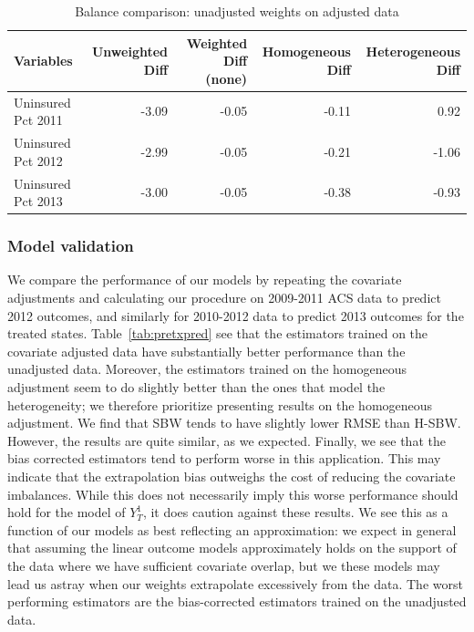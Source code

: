 \documentclass[article]{imsart}
\theoremstyle{plain}
\theoremstyle{remark}
\begin{document}
\begin{table}[ht]
\caption{Balance comparison: unadjusted weights on adjusted data}
\label{tab:balcomp}
\begin{tabular}{lrrrr}
  \hline
Variables & Unweighted Diff & Weighted Diff (none) & Homogeneous Diff & Heterogeneous Diff\\ 
  \hline
Uninsured Pct 2011 & -3.09 & -0.05 & -0.11 & 0.92 \\ 
  Uninsured Pct 2012 & -2.99 & -0.05 & -0.21 & -1.06 \\ 
  Uninsured Pct 2013 & -3.00 & -0.05 & -0.38 & -0.93 \\
   \hline
\end{tabular}
\end{table}

\subsubsection{Model validation}

We compare the performance of our models by repeating the covariate adjustments and calculating our procedure on 2009-2011 ACS data to predict 2012 outcomes, and similarly for 2010-2012 data to predict 2013 outcomes for the treated states. Table~\ref{tab:pretxpred} see that the estimators trained on the covariate adjusted data have substantially better performance than the unadjusted data. Moreover, the estimators trained on the homogeneous adjustment seem to do slightly better than the ones that model the heterogeneity; we therefore prioritize presenting results on the homogeneous adjustment. We find that SBW tends to have slightly lower RMSE than H-SBW. However, the results are quite similar, as we expected. Finally, we see that the bias corrected estimators tend to perform worse in this application. This may indicate that the extrapolation bias outweighs the cost of reducing the covariate imbalances. While this does not necessarily imply this worse performance should hold for the model of $Y^1_T$, it does caution against these results. We see this as a function of our models as best reflecting an approximation: we expect in general that assuming the linear outcome models approximately holds on the support of the data where we have sufficient covariate overlap, but we these models may lead us astray when our weights extrapolate excessively from the data. The worst performing estimators are the bias-corrected estimators trained on the unadjusted data.
\end{document}
